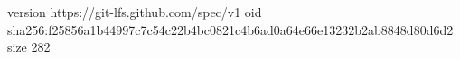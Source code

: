 version https://git-lfs.github.com/spec/v1
oid sha256:f25856a1b44997c7c54c22b4bc0821c4b6ad0a64e66e13232b2ab8848d80d6d2
size 282
